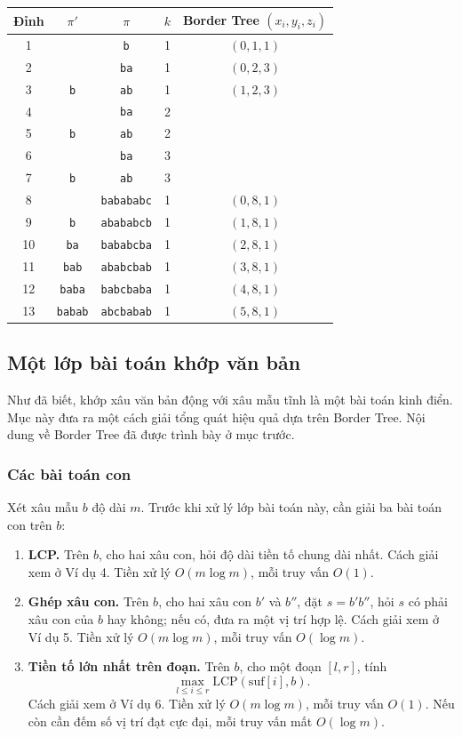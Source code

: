 \documentclass[11pt]{article}
\begin{document}
\begin{center}
\begin{tabular}{c c c c c}
\hline
Đỉnh & \(\pi'\) & \(\pi\) & \(k\) & Border Tree \((x_i,y_i,z_i)\)\\
\hline
1 & & \texttt{b} & 1 & \((0,1,1)\)\\
2 & & \texttt{ba} & 1 & \((0,2,3)\)\\
3 & \texttt{b} & \texttt{ab} & 1 & \((1,2,3)\)\\
4 & & \texttt{ba} & 2 & \\
5 & \texttt{b} & \texttt{ab} & 2 & \\
6 & & \texttt{ba} & 3 & \\
7 & \texttt{b} & \texttt{ab} & 3 & \\
8 & & \texttt{babababc} & 1 & \((0,8,1)\)\\
9 & \texttt{b} & \texttt{abababcb} & 1 & \((1,8,1)\)\\
10 & \texttt{ba} & \texttt{bababcba} & 1 & \((2,8,1)\)\\
11 & \texttt{bab} & \texttt{ababcbab} & 1 & \((3,8,1)\)\\
12 & \texttt{baba} & \texttt{babcbaba} & 1 & \((4,8,1)\)\\
13 & \texttt{babab} & \texttt{abcbabab} & 1 & \((5,8,1)\)\\
\hline
\end{tabular}
\end{center}

\subsection{Một lớp bài toán khớp văn bản}

Như đã biết, khớp xâu văn bản động với xâu mẫu tĩnh là một bài toán kinh điển.
Mục này đưa ra một cách giải tổng quát hiệu quả dựa trên Border Tree. Nội dung
về Border Tree đã được trình bày ở mục trước.

\subsubsection{Các bài toán con}

Xét xâu mẫu \(b\) độ dài \(m\). Trước khi xử lý lớp bài toán này, cần giải ba
bài toán con trên \(b\):
\begin{enumerate}
  \item \textbf{LCP.} Trên \(b\), cho hai xâu con, hỏi độ dài tiền tố chung dài
  nhất. Cách giải xem ở Ví dụ 4. Tiền xử lý \(O(m\log m)\), mỗi truy vấn
  \(O(1)\).
  \item \textbf{Ghép xâu con.} Trên \(b\), cho hai xâu con \(b'\) và \(b''\),
  đặt \(s=b'b''\), hỏi \(s\) có phải xâu con của \(b\) hay không; nếu có, đưa
  ra một vị trí hợp lệ. Cách giải xem ở Ví dụ 5. Tiền xử lý \(O(m\log m)\), mỗi
  truy vấn \(O(\log m)\).
  \item \textbf{Tiền tố lớn nhất trên đoạn.} Trên \(b\), cho một đoạn
  \([l,r]\), tính
  \[
    \max_{l\le i\le r}\mathrm{LCP}(\mathrm{suf}[i],b).
  \]
  Cách giải xem ở Ví dụ 6. Tiền xử lý \(O(m\log m)\), mỗi truy vấn \(O(1)\).
  Nếu còn cần đếm số vị trí đạt cực đại, mỗi truy vấn mất \(O(\log m)\).
\end{enumerate}
\end{document}
